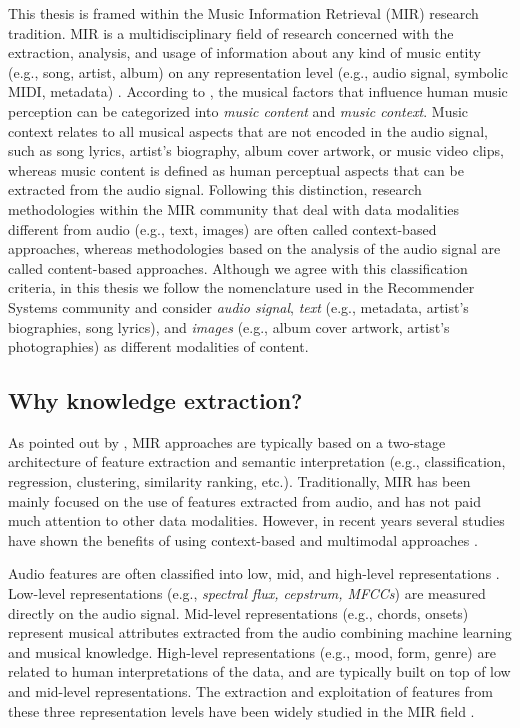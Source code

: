 This thesis is framed within the Music Information Retrieval (MIR) research tradition. 
MIR is a multidisciplinary field of research concerned with the extraction, analysis, and usage of information about any kind of music entity (e.g., song, artist, album) on any representation level (e.g., audio signal, symbolic MIDI, metadata) \citep{schedl2008}. According to \cite{Schedl2013}, the musical factors that influence human music perception can be categorized into \textit{music content} and \textit{music context}. %
Music context relates to all musical aspects that are not encoded in the audio signal, such as song lyrics, artist's biography, album cover artwork, or music video clips, whereas music content is defined as human perceptual aspects that can be extracted from the audio signal. %
Following this distinction, research methodologies within the MIR community that deal with data modalities different from audio (e.g., text, images) are often called context-based approaches, whereas methodologies based on the analysis of the audio signal are called content-based approaches. 
Although we agree with this classification criteria, in this thesis we follow the nomenclature used in the Recommender Systems community \citep{Ostuni2013} and consider \textit{audio signal}, \textit{text} (e.g., metadata, artist's biographies, song lyrics), and \textit{images} (e.g., album cover artwork, artist's photographies) as different modalities of content.

\subsection{Why knowledge extraction?}
\label{sec:intro:nlp}

As pointed out by \cite{humphrey2012}, MIR approaches are typically based on a two-stage architecture of feature extraction and semantic interpretation (e.g., classification, regression, clustering, similarity ranking, etc.). 
Traditionally, MIR has been mainly focused on the use of features extracted from audio, and has not paid much attention to other data modalities. However, in recent years several studies have shown the benefits of using context-based and multimodal approaches \citep{Schedl2014}. 

Audio features are often classified into low, mid, and high-level representations \citep{bello2005}. Low-level representations (e.g., \textit{spectral flux, cepstrum, MFCCs}) are measured directly on the audio signal. Mid-level representations (e.g., chords, onsets) represent musical attributes extracted from the audio combining machine learning and musical knowledge. High-level representations (e.g., mood, form, genre) are related to human interpretations of the data, and are typically built on top of low and mid-level representations. The extraction and exploitation of features from these three representation levels have been widely studied in the MIR field \citep{casey2008content}. 

